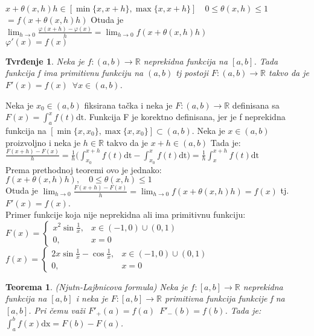 \documentclass{article}
\newtheorem{teorema}{Teorema}[section]
\newtheorem{tvr}{Tvrđenje}[section]
\begin{document}
$x+\theta(x,h)h \in [\min\{x, x+h\}, \max\{x, x+h\}]\quad 0 \leq \theta(x, h) \leq 1$\\
$= f(x+\theta(x, h)h)$ Otuda je $\displaystyle \lim_{h\longrightarrow 0}\frac{\varphi(x+h) - \varphi(x)}{h} = \lim_{h\longrightarrow 0} f(x+\theta(x, h)h)$\\
$\varphi'(x) = f(x)$
\begin{tvrbox}
    \begin{tvr}
        Neka je $f: (a, b) \longrightarrow \mathbb{R}$ neprekidna funkcija na $[a, b]$. Tada funkcija f ima primitivnu funkciju na $(a, b)$ tj postoji $F: (a, b) \longrightarrow \mathbb{R}$ takvo da je $F'(x) = f(x)\,\,\, \forall x\in (a, b)$.
    \end{tvr}
\end{tvrbox}
Neka je $x_0\in(a, b)$ fiksirana tačka i neka je $F:(a, b) \longrightarrow \mathbb{R}$ definisana sa $F(x) = \displaystyle\int^x_a f(t)\text{dt}$. Funkcija F je korektno definisana, jer je f neprekidna funkcija na $[\min\{x, x_0\}, \max\{x, x_0\}]\subset(a, b)$. Neka je $x\in(a, b)$ proizvoljno i neka je $h\in\mathbb{R}$ takvo da je $x+h\in(a, b)$ Tada je:\\
$\displaystyle \frac{F(x+h)-F(x)}{h} = \frac{1}{h}\bigg(\int^{x+h}_{x_0} f(t)\text{dt} - \int^{x}_{x_0} f(t)\text{dt}\bigg) = \frac{1}{h}\int^{x+h}_x f(t)\text{dt}$\\
Prema prethodnoj teoremi ovo je jednako: $f(x+\theta(x, h)h),\quad 0\leq \theta(x, h)\leq 1$\\
Otuda je $\displaystyle \lim_{h\longrightarrow 0}\frac{F(x+h)-F(x)}{h} = \lim_{h\longrightarrow 0} f(x+\theta(x, h)h) = f(x)$ tj. $F'(x) = f(x)$.\\
Primer funkcije koja nije neprekidna ali ima primitivnu funkciju:\\
$F(x) = \begin{cases}
        x^2\sin\frac{1}{x}, & x\in (-1,0)\cup(0, 1) \\
        0,                  & x = 0
    \end{cases}$\\
$f(x) = \begin{cases}
        2x\sin\frac{1}{x} - \cos\frac{1}{x}, & x\in(-1,0)\cup(0,1) \\
        0,                                   & x = 0
    \end{cases}$
\begin{teoremabox}
    \begin{teorema}
        (Njutn-Lajbnicova formula) Neka je $f:[a, b]\longrightarrow \mathbb{R}$ neprekidna funkcija na $[a,b]$ i neka je $F:[a, b]\longrightarrow\mathbb{R}$ primitivna funkcija funkcije f na $[a,b]$. Pri čemu važi $F'_+ (a) = f(a)\,\,\,F'_-(b) = f(b)$. Tada je: $\displaystyle \int^b_a f(x)\text{dx} = F(b) - F(a)$.
    \end{teorema}
\end{teoremabox}
\end{document}
